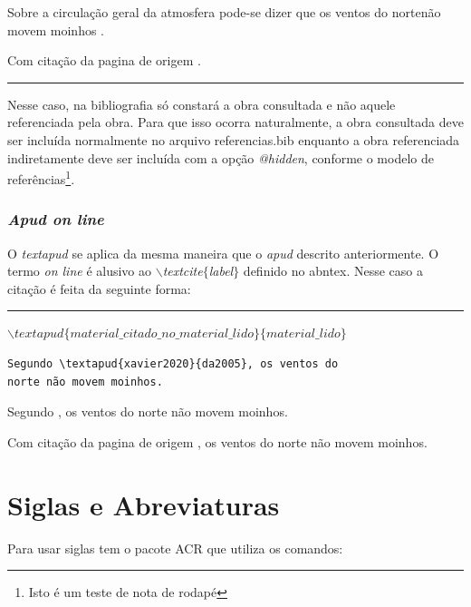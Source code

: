   Sobre a circulação geral da atmosfera pode-se dizer que os ventos do nortenão movem moinhos .
  
  Com citação da pagina de origem .
  
\begin{center}\rule{0.5\textwidth}{1pt}\end{center}  
  \par Nesse caso, na bibliografia só constará a obra consultada e não aquele referenciada pela obra. Para que isso ocorra naturalmente, a obra consultada deve ser incluída normalmente no arquivo referencias.bib enquanto a obra referenciada indiretamente deve ser incluída com a opção \textit{@hidden}, conforme o modelo de referências\footnote{Isto é um teste de nota de rodapé}.

      \subsubsection{\textit{Apud on line}}

      
      \par O \textit{textapud} se aplica da mesma maneira que o \textit{apud} descrito anteriormente. O termo \textit{on line} é alusivo ao \textit{$\backslash$textcite$\{$label$\}$} definido no abntex. Nesse caso a citação é feita da seguinte forma:
      \begin{center}
      \rule{0.5\textwidth}{1pt}
            $\backslash textapud\{material\_citado\_no\_material\_lido\}\{material\_lido\}$ \\
	    \end{center}

 \begin{verbatim}
Segundo \textapud{xavier2020}{da2005}, os ventos do
norte não movem moinhos.
\end{verbatim}

            Segundo , os ventos do norte não movem moinhos.
            
            Com citação da pagina de origem  , os ventos do norte não movem moinhos.



\section{Siglas e Abreviaturas}
\label{sec:siglas}

Para usar siglas tem o pacote \acrfull{ACR} que utiliza os comandos:

